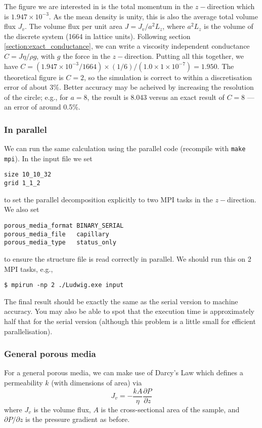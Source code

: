 The figure we are interested in is the total momentum in the
$z-$direction which is $1.947\times 10^{-3}$. As the mean
density is unity, this is also the average total volume flux $J_v$.
The volume flux per unit area $J = J_v / a^2 L_z$, where $a^2 L_z$
is the volume of the discrete system (1664 in lattice units).
Following section \ref{section:exact_conductance},
we can write a viscosity independent conductance
$C = J\eta / \rho g$, with $g$ the force in the $z-$direction.
Putting all this together, we have $C = (1.947\times 10^{-3} / 1664)
\times (1/6) / (1.0 \times 1\times 10^{-7}) = 1.950$. The theoretical
figure is $C = 2$, so the simulation is correct to within a discretisation
error of about 3\%. Better accuracy may be acheived by increasing the
resolution of the circle; e.g., for $a = 8$, the result is 8.043 versus
an exact result of $C = 8$ --- an error of around 0.5\%.

\subsubsection{In parallel}

We can run the same calculation using the parallel code (recompile
with \texttt{make mpi}). In the input file we set
\begin{verbatim}
size 10_10_32
grid 1_1_2
\end{verbatim}
to set the parallel decomposition explicitly to two MPI tasks in the
$z-$direction. We also set
\begin{verbatim}
porous_media_format BINARY_SERIAL
porous_media_file   capillary
porous_media_type   status_only
\end{verbatim}
to ensure the structure file is read correctly in parallel.
We should run this on 2 MPI tasks, e.g.,
\begin{verbatim}
$ mpirun -np 2 ./Ludwig.exe input
\end{verbatim}
The final result should be exactly the same as the serial version
to machine accuracy. You may also be able to spot that the execution
time is approximately half that for the serial version (although this
problem is a little small for efficient parallelisation).

\subsubsection{General porous media}

For a general porous media, we can make use of Darcy's Law which
defines a permeability $k$ (with dimensions of area) via
\begin{equation}
J_v = - \frac{k A}{\eta} \frac{\partial P}{\partial z}
\end{equation}
where $J_v$ is the volume flux, $A$ is the cross-sectional area
of the sample, and $\partial P / \partial z$ is the pressure gradient
as before. 


